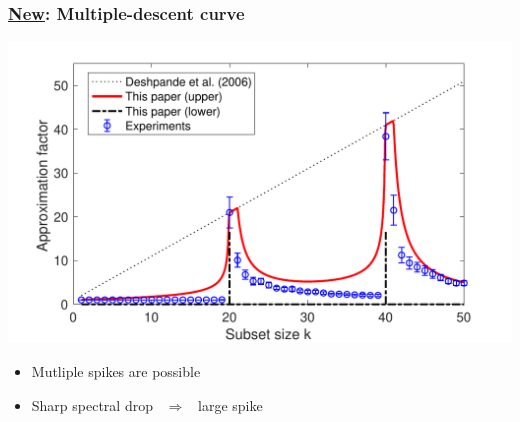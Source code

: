 \documentclass{beamer}
\begin{document}
\begin{frame}
  \frametitle{\underline{New}: Multiple-descent curve}
  \centering\includegraphics[width=.8\textwidth]{../figs/nystrom/nystrom-bounds}
 
  \begin{itemize}
  \item Mutliple spikes are possible
  \item Sharp spectral drop \ $\Longrightarrow$ \ large spike
  \end{itemize}
\end{frame}
\end{document}
